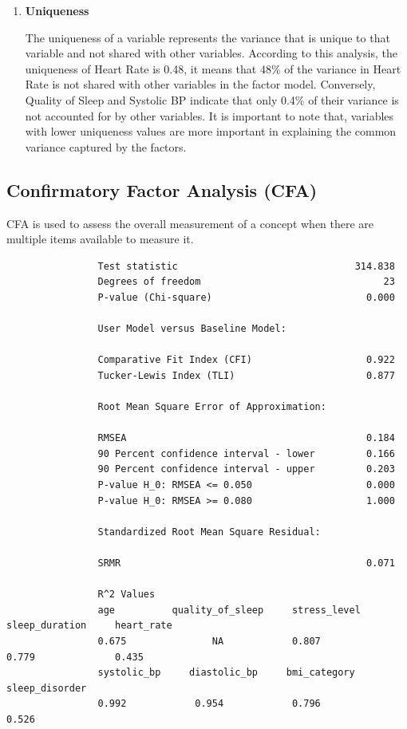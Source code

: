 \documentclass[11pt]{article}
\begin{document}
\begin{enumerate}
			\item \textbf{Uniqueness}
			
			The uniqueness of a variable represents the variance that is unique to that variable and not shared with other variables. According to this analysis, the uniqueness of Heart Rate is 0.48, it means that 48\% of the variance in Heart Rate is not shared with other variables in the factor model. Conversely, Quality of Sleep and Systolic BP indicate that only 0.4\% of their variance is not accounted for by other variables. It is important to note that, variables with lower uniqueness values are more important in explaining the common variance captured by the factors.
			
		\end{enumerate}
		
		\newpage
		\subsection{Confirmatory Factor Analysis (CFA)}
		CFA is used to assess the overall measurement of a concept when there are
		multiple items available to measure it. 
		
		\begin{tcolorbox}[colback=white,colframe=black]
			\begin{verbatim}
				Test statistic                               314.838
				Degrees of freedom                                23
				P-value (Chi-square)                           0.000
				
				User Model versus Baseline Model:
				
				Comparative Fit Index (CFI)                    0.922
				Tucker-Lewis Index (TLI)                       0.877
				
				Root Mean Square Error of Approximation:
				
				RMSEA                                          0.184
				90 Percent confidence interval - lower         0.166
				90 Percent confidence interval - upper         0.203
				P-value H_0: RMSEA <= 0.050                    0.000
				P-value H_0: RMSEA >= 0.080                    1.000
				
				Standardized Root Mean Square Residual:
				
				SRMR                                           0.071
				
				R^2 Values
				age          quality_of_sleep     stress_level   sleep_duration 	heart_rate      
				0.675               NA            0.807            0.779	          0.435             
				systolic_bp     diastolic_bp     bmi_category 	sleep_disorder 
				0.992            0.954            0.796            0.526 
				
			\end{verbatim}
		\end{tcolorbox}
\end{document}
